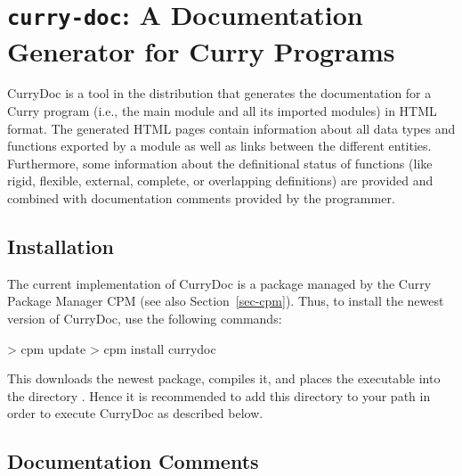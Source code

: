 \section{\texttt{curry-doc}: A Documentation Generator for Curry Programs}

CurryDoc%
is a tool in the \CYS distribution that generates
the documentation for a Curry program (i.e., the main module
and all its imported modules) in HTML format.
The generated HTML pages contain information about
all data types and functions exported by a module as well
as links between the different entities.
Furthermore, some information about the definitional status
of functions (like rigid, flexible, external, complete, or
overlapping definitions) are provided and combined with
documentation comments provided by the programmer.

\subsection{Installation}

The current implementation of CurryDoc is a package
managed by the Curry Package Manager CPM
(see also Section~\ref{sec-cpm}).
Thus, to install the newest version of CurryDoc, use the following commands:
%
\begin{curry}
> cpm update
> cpm install currydoc
\end{curry}
%
This downloads the newest package, compiles it, and places
the executable  into the directory .
Hence it is recommended to add this directory to your path
in order to execute CurryDoc as described below.

\subsection{Documentation Comments}

